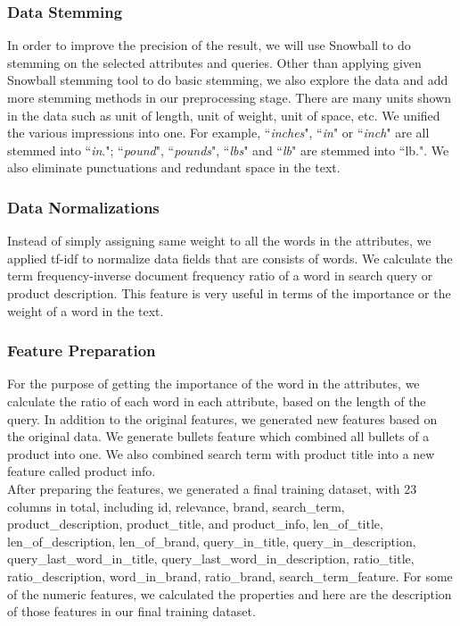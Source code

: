 \documentclass{sig-alternate-05-2015}
\begin{document}
\subsubsection{Data Stemming}
In order to improve the precision of the result, we will use Snowball to do stemming on the selected attributes and queries.\cite{snowball} Other than applying given Snowball stemming tool to do basic stemming, we also explore the data and add more stemming methods in our preprocessing stage. There are many units shown in the data such as unit of length, unit of weight, unit of space, etc. We unified the various impressions into one. For example, ``\textit{inches}", ``\textit{in}" or ``\textit{inch}" are all stemmed into ``\textit{in}."; ``\textit{pound}", ``\textit{pounds}", ``\textit{lbs}" and ``\textit{lb}" are stemmed into ``lb.". We also eliminate punctuations and redundant space in the text.

\subsubsection{Data Normalizations}
Instead of simply assigning same weight to all the words in the attributes, we applied tf-idf to normalize data fields that are consists of words. We calculate the term frequency-inverse document frequency ratio of a word in search query or product description.\cite{tf-idf, tf-idf1} This feature is very useful in terms of the importance or the weight of a word in the text.

\subsubsection{Feature Preparation}
For the purpose of getting the importance of the word in the attributes, we calculate the ratio of each word in each attribute, based on the length of the query. In addition to the original features, we generated new features based on the original data. We generate bullets feature which combined all bullets of a product into one. We also combined search term with product title into a new feature called product info. \\

After preparing the features, we generated a final training dataset, with 23 columns in total, including id, relevance, brand, search\_term, product\_description, product\_title, and product\_info, len\_of\_title, len\_of\_description, len\_of\_brand, query\_in\_title, query\_in\_description, query\_last\_word\_in\_title, query\_last\_word\_in\_description, ratio\_title, ratio\_description, word\_in\_brand, ratio\_brand, search\_term\_feature. For some of the numeric features, we calculated the properties and here are the description of those features in our final training dataset.\\
\end{document}
